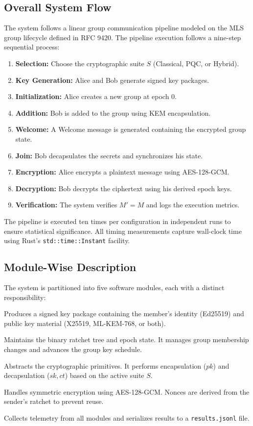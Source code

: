 \documentclass{ieeeaccess}
\begin{document}
\subsection{Overall System Flow}
The system follows a linear group communication pipeline modeled on the MLS group lifecycle defined in RFC 9420. The pipeline execution follows a nine-step sequential process:

\begin{enumerate}
    \item \textbf{Selection:} Choose the cryptographic suite $S$ (Classical, PQC, or Hybrid).
    \item \textbf{Key Generation:} Alice and Bob generate signed key packages.
    \item \textbf{Initialization:} Alice creates a new group at epoch 0.
    \item \textbf{Addition:} Bob is added to the group using KEM encapsulation.
    \item \textbf{Welcome:} A Welcome message is generated containing the encrypted group state.
    \item \textbf{Join:} Bob decapsulates the secrets and synchronizes his state.
    \item \textbf{Encryption:} Alice encrypts a plaintext message using AES-128-GCM.
    \item \textbf{Decryption:} Bob decrypts the ciphertext using his derived epoch keys.
    \item \textbf{Verification:} The system verifies $M' = M$ and logs the execution metrics.
\end{enumerate}

The pipeline is executed ten times per configuration in independent runs to ensure statistical significance. All timing measurements capture wall-clock time using Rust’s \texttt{std::time::Instant} facility.

\subsection{Module-Wise Description}
The system is partitioned into five software modules, each with a distinct responsibility:
\begin{description}[style=nextline]
    \item[Key Package Generator:] Produces a signed key package containing the member's identity (Ed25519) and public key material (X25519, ML-KEM-768, or both).
    \item[Group State Manager:] Maintains the binary ratchet tree and epoch state. It manages group membership changes and advances the group key schedule.
    \item[KEM Encapsulation Engine:] Abstracts the cryptographic primitives. It performs encapsulation ($pk$) and decapsulation ($sk, ct$) based on the active suite $S$.
    \item[Message Encryption Layer:] Handles symmetric encryption using AES-128-GCM. Nonces are derived from the sender's ratchet to prevent reuse.
    \item[Benchmark Module:] Collects telemetry from all modules and serializes results to a \texttt{results.jsonl} file.
\end{description}
\end{document}
